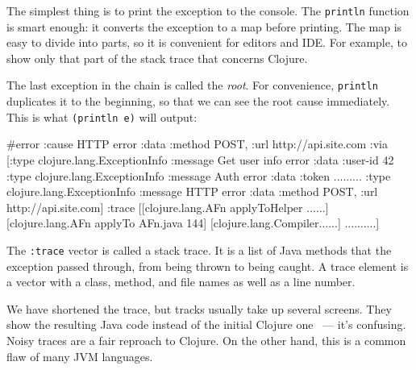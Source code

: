 The simplest thing is to print the exception to the console. The \verb|println| function is smart enough: it converts the exception to a map before printing. The map is easy to divide into parts, so it is convenient for editors and IDE. For example, to show only that part of the stack trace that concerns Clojure.

The last exception in the chain is called the \emph{root}. For convenience, \verb|println| duplicates it to the beginning, so that we can see the root cause immediately. This is what \verb|(println e)| will output:


 \ifx\DEVICETYPE\MOBILE

\begin{clojure}
#error {
 :cause HTTP error
 :data {:method POST,
        :url http://api.site.com}
 :via
 [{:type clojure.lang.ExceptionInfo
   :message Get user info error
   :data {:user-id 42}}
  {:type clojure.lang.ExceptionInfo
   :message Auth error
   :data {:token .........}}
  {:type clojure.lang.ExceptionInfo
   :message HTTP error
   :data {:method POST,
          :url http://api.site.com}}]
 :trace
 [[clojure.lang.AFn applyToHelper ......]
  [clojure.lang.AFn applyTo AFn.java 144]
  [clojure.lang.Compiler......]
  ..........]}
\end{clojure}

\else


\fi


The \verb|:trace| vector is called a stack trace. It is a list of Java methods that the exception passed through, from being thrown to being caught. A trace element is a vector with a class, method, and file names as well as a line number.

We have shortened the trace, but tracks usually take up several screens. They show the resulting Java code instead of the initial Clojure one ~--- it's confusing. Noisy traces are a fair reproach to Clojure. On the other hand, this is a common flaw of many JVM languages.

